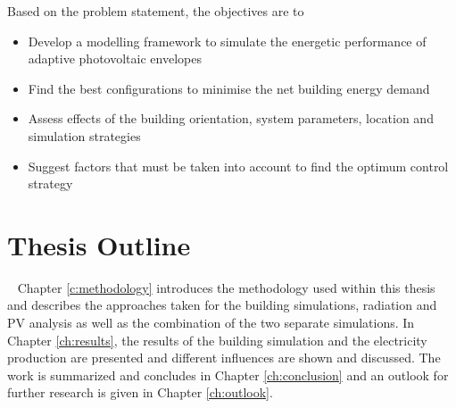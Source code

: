 	Based on the problem statement, the objectives are to

	\begin{itemize}
		\item Develop a modelling framework to simulate the energetic performance of adaptive photovoltaic envelopes
		\item Find the best configurations to minimise the net building energy demand
		\item Assess effects of the building orientation, system parameters, location and simulation strategies
		\item Suggest factors that must be taken into account to find the optimum control strategy
	\end{itemize}


\section{Thesis Outline}\
	Chapter \ref{c:methodology} introduces the methodology used within this thesis and describes the approaches taken for the building simulations, radiation and PV analysis as well as the combination of the two separate simulations. In Chapter \ref{ch:results}, the results of the building simulation and the electricity production are presented and different influences are shown and discussed. The work is summarized and concludes in Chapter \ref{ch:conclusion} and an outlook for further research is given in Chapter \ref{ch:outlook}. 

